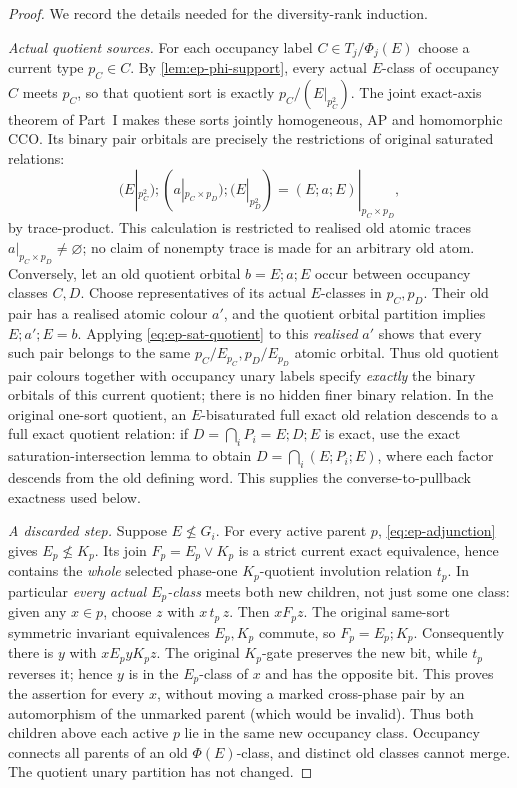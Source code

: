 \begin{proof}
We record the details needed for the diversity-rank induction.

\emph{Actual quotient sources.}
For each occupancy label \(C\in T_j/\Phi_j(E)\) choose
a current type \(p_C\in C\).
By \cref{lem:ep-phi-support}, every actual \(E\)-class
of occupancy \(C\) meets \(p_C\), so that quotient sort
is exactly \(p_C/(E|_{p_C^2})\).
The joint exact-axis theorem of Part~I makes these
sorts jointly homogeneous, AP and homomorphic CCO.
Its binary pair orbitals are precisely the restrictions
of original saturated relations:
\[
 (E|_{p_C^2});(a|_{p_C\times p_D});(E|_{p_D^2})
   =(E;a;E)|_{p_C\times p_D},
 \tag{E7}\label{eq:ep-sat-quotient}
\]
by trace-product. This calculation is restricted to realised old atomic
traces \(a|_{p_C\times p_D}\ne\varnothing\); no claim
of nonempty trace is made for an arbitrary old atom.
Conversely, let an old quotient orbital
\(b=E;a;E\) occur between occupancy classes \(C,D\).
Choose representatives of its actual \(E\)-classes
in \(p_C,p_D\). Their old pair has a realised
atomic colour \(a'\), and the quotient orbital
partition implies \(E;a';E=b\).
Applying \eqref{eq:ep-sat-quotient} to this
\emph{realised} \(a'\) shows that every such pair
belongs to the same \(p_C/E_{p_C},p_D/E_{p_D}\)
atomic orbital. Thus old quotient pair colours
together with occupancy unary labels specify
\emph{exactly} the binary orbitals of this
current quotient; there is no hidden finer
binary relation.
In the original one-sort quotient,
an \(E\)-bisaturated full exact old relation descends to
a full exact quotient relation: if
\(D=\bigcap_iP_i=E;D;E\) is exact, use the
exact saturation-intersection lemma to obtain
\(D=\bigcap_i(E;P_i;E)\), where each factor descends
from the old defining word. This supplies the
converse-to-pullback exactness used below.

\emph{A discarded step.}
Suppose \(E\not\le G_i\).
For every active parent \(p\),
\eqref{eq:ep-adjunction} gives \(E_p\not\le K_p\).
Its join \(F_p=E_p\vee K_p\) is a strict
current exact equivalence, hence contains the
\emph{whole} selected phase-one \(K_p\)-quotient
involution relation \(t_p\).
In particular \emph{every actual \(E_p\)-class}
meets both new children, not just some one class:
given any \(x\in p\), choose \(z\) with
\(x\,t_p\,z\). Then \(xF_pz\).
The original same-sort symmetric invariant
equivalences \(E_p,K_p\) commute, so
\(F_p=E_p;K_p\). Consequently there is
\(y\) with \(xE_pyK_pz\). The original
\(K_p\)-gate preserves the new bit, while
\(t_p\) reverses it; hence \(y\) is in
the \(E_p\)-class of \(x\) and has the
opposite bit. This proves the assertion
for every \(x\), without moving
a marked cross-phase pair by an automorphism
of the unmarked parent (which would be invalid).
Thus both children above each active
\(p\) lie in the same new occupancy class.
Occupancy connects all parents of an old
\(\Phi(E)\)-class, and distinct old classes cannot merge.
The quotient unary partition has not changed.


\end{proof}
